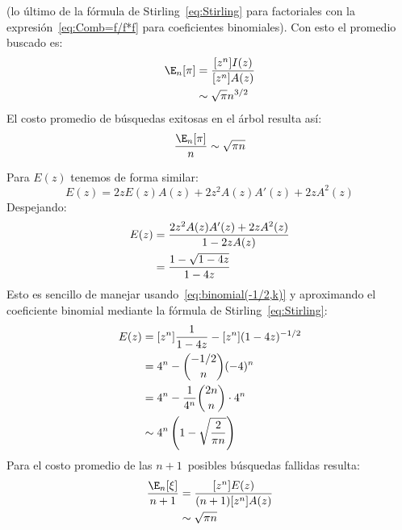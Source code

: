   (lo último de la fórmula de Stirling~\eqref{eq:Stirling}%
   para factoriales con la expresión~\eqref{eq:Comb=f/f*f}
   para coeficientes binomiales).
  Con esto el promedio buscado es:
  \begin{align}
    \E_n[\pi]
      &=    \frac{[z^n] I(z)}{[z^n] A(z)} \notag \\
      &\sim \sqrt{\pi} n^{3/2}
	  \label{eq:En-pi-value}
  \end{align}
  El costo promedio de búsquedas exitosas en el árbol
  resulta así:%
  \begin{equation}
    \frac{\E_n[\pi]}{n}
      \sim \sqrt{\pi n}
	  \label{eq:A-success-asy}
  \end{equation}

  Para \(E(z)\) tenemos de forma similar:
  \begin{equation*}
    \label{eq:E-functional}
    E(z)
      = 2 z E(z) A(z) + 2 z^2 A(z) A'(z) + 2 z A^2(z)
  \end{equation*}
  Despejando:
  \begin{align}
    E(z)
      &= \frac{2 z^2 A(z) A'(z) + 2 z A^2(z)}{1 - 2 z A(z)}  \notag \\
      &= \frac{1 - \sqrt{1 - 4 z}}
	      {1 - 4 z}
	    \label{eq:E-explicit}
  \end{align}
  Esto es sencillo de manejar usando~\eqref{eq:binomial(-1/2,k)}
  y aproximando el coeficiente binomial
  mediante la fórmula de Stirling~\eqref{eq:Stirling}:
  \begin{align}
    [z^n] E(z)
      &=    [z^n] \frac{1}{1 - 4 z} - [z^n] (1 - 4 z)^{-1/2} \notag \\
      &=    4^n - \binom{-1/2}{n}(-4)^n \notag \\
      &=    4^n - \frac{1}{4^n} \binom{2 n}{n} \cdot 4^n \notag \\
      &\sim 4^n \left(1 - \sqrt{\frac{2}{\pi n}} \right)
	   \label{eq:E-asy}
  \end{align}
  Para el costo promedio de las \(n + 1\)~posibles búsquedas fallidas%
  resulta:
  \begin{align}
    \frac{\E_n[\xi]}{n + 1}
      &=    \frac{[z^n] E(z)}{(n + 1) [z^n] A(z)} \notag \\
      &\sim \sqrt{\pi n}
	  \label{eq:A-fail-asy}
  \end{align}

